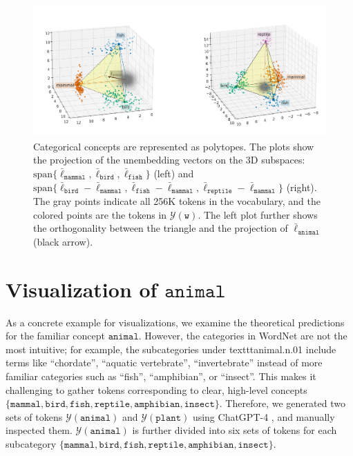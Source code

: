 \documentclass{article}
\newcommand{\ConceptName}[1]{$\mathtt{#1}$}
\newcommand{\ConceptValue}[1]{\texttt{#1}}
\newcommand{\yquad}{\mathcal{Y}}
\begin{document}
\begin{figure}[t]
  \centering
  \includegraphics[trim={1cm 1cm 0.5cm 2cm}, clip, width=1.0\linewidth]{figures/two_3D_plots.png}
  \caption{Categorical concepts are represented as polytopes.
  The plots show the projection of the unembedding vectors on the 3D subspaces: $\mathrm{span}\{\bar\ell_{\ConceptValue{mammal}}, \bar\ell_{\ConceptValue{bird}},\bar\ell_{\ConceptValue{fish}}\}$ (left) and $\mathrm{span}\{\bar\ell_{\ConceptValue{bird}} - \bar\ell_{\ConceptValue{mammal}}, \bar\ell_{\ConceptValue{fish}} - \bar\ell_{\ConceptValue{mammal}}, \bar\ell_{\ConceptValue{reptile}} - \bar\ell_{\ConceptValue{mammal}} \}$ (right).
  The gray points indicate all 256K tokens in the vocabulary, and the colored points are the tokens in $\yquad(\ConceptValue{w})$.
  The left plot further shows the orthogonality between the triangle and the projection of $\bar\ell_{\ConceptValue{animal}}$ (black arrow).}
  \label{fig:two_3D_plots}
\end{figure}

\section{Visualization of \ConceptName{animal}}\label{sec:visualization}
As a concrete example for visualizations, we examine the theoretical predictions for the familiar concept \ConceptName{animal}.
However, the categories in WordNet are not the most intuitive; for example, the subcategories under texttt{animal.n.01} include terms like ``chordate'', ``aquatic vertebrate'', ``invertebrate'' instead of more familiar categories such as ``fish'', ``amphibian'', or ``insect''.
This makes it challenging to gather tokens corresponding to clear, high-level concepts $\{ \ConceptValue{mammal}, \ConceptValue{bird}, \ConceptValue{fish}, \ConceptValue{reptile},\ConceptValue{amphibian}, \ConceptValue{insect}\}$. Therefore, we generated two sets of tokens $\yquad(\ConceptValue{animal})$ and $\yquad(\ConceptValue{plant})$ using ChatGPT-4 , and manually inspected them.
$\yquad(\ConceptValue{animal})$ is further divided into six sets of tokens for each subcategory $\{\ConceptValue{mammal}, \ConceptValue{bird},\ConceptValue{fish},\ConceptValue{reptile},\ConceptValue{amphibian},\ConceptValue{insect}\}$.
\end{document}
